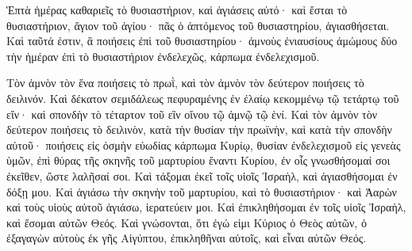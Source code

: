 {Ἑπτὰ ἡμέρας καθαριεῖς τὸ θυσιαστήριον, καὶ ἁγιάσεις αὐτό· καὶ ἔσται τὸ θυσιαστήριον, ἅγιον τοῦ ἁγίου· πᾶς ὁ ἁπτόμενος τοῦ θυσιαστηρίου, ἁγιασθήσεται.
Καὶ ταῦτά ἐστιν, ἃ ποιήσεις ἐπὶ τοῦ θυσιαστηρίου· ἀμνοὺς ἐνιαυσίους ἀμώμους δύο τὴν ἡμέραν ἐπὶ τὸ θυσιαστήριον ἐνδελεχῶς, κάρπωμα ἐνδελεχισμοῦ.
\par }{\PP {}Τὸν ἀμνὸν τὸν ἕνα ποιήσεις τὸ πρωῒ, καὶ τὸν ἀμνὸν τὸν δεύτερον ποιήσεις τὸ δειλινόν.
Καὶ δέκατον σεμιδάλεως πεφυραμένης ἐν ἐλαίῳ κεκομμένῳ τῷ τετάρτῳ τοῦ εἴν· καὶ σπονδὴν τὸ τέταρτον τοῦ εἳν οἴνου τῷ ἀμνῷ τῷ ἑνί.
Καὶ τὸν ἀμνὸν τὸν δεύτερον ποιήσεις τὸ δειλινὸν, κατὰ τὴν θυσίαν τὴν πρωϊνὴν, καὶ κατὰ τὴν σπονδὴν αὐτοῦ· ποιήσεις εἰς ὀσμὴν εὐωδίας κάρπωμα Κυρίῳ,
θυσίαν ἐνδελεχισμοῦ εἰς γενεὰς ὑμῶν, ἐπὶ θύρας τῆς σκηνῆς τοῦ μαρτυρίου ἔναντι Κυρίου, ἐν οἷς γνωσθήσομαί σοι ἐκεῖθεν, ὥστε λαλῆσαί σοι.
Καὶ τάξομαι ἐκεῖ τοῖς υἱοῖς Ἰσραὴλ, καὶ ἁγιασθήσομαι ἐν δόξῃ μου.
Καὶ ἁγιάσω τὴν σκηνὴν τοῦ μαρτυρίου, καὶ τὸ θυσιαστήριον· καὶ Ἀαρὼν καὶ τοὺς υἱοὺς αὐτοῦ ἁγιάσω, ἱερατεύειν μοι.
Καὶ ἐπικληθήσομαι ἐν τοῖς υἱοῖς Ἰσραὴλ, καὶ ἔσομαι αὐτῶν Θεός.
Καὶ γνώσονται, ὅτι ἐγώ εἰμι Κύριος ὁ Θεὸς αὐτῶν, ὁ ἐξαγαγὼν αὐτοὺς ἐκ γῆς Αἰγύπτου, ἐπικληθῆναι αὐτοῖς, καὶ εἶναι αὐτῶν Θεός.

}
